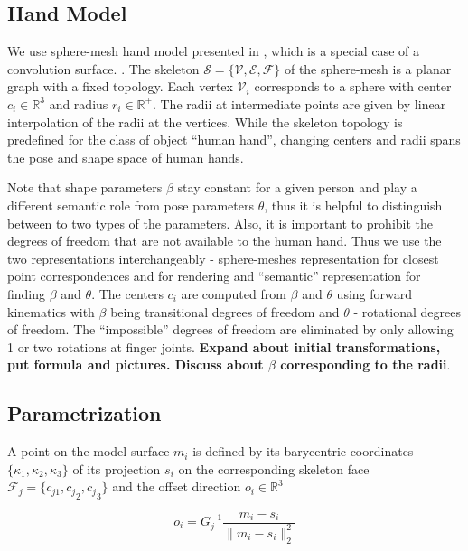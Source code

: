 \documentclass[10pt,twocolumn,letterpaper]{article}
\begin{document}
\subsection {Hand Model}

We use sphere-mesh hand model presented in \cite{tkach2016sphere}, which is a special case of a convolution surface. \textbf{\color{accent}{Maybe briefly recap advantages of sphere-meshes hand model representation}}. 
The skeleton $\mathcal{S} = \{\mathcal{V}, \mathcal{E}, \mathcal{F}\}$ of the sphere-mesh is a planar graph with a fixed topology. Each vertex $\mathcal{V}_i$ corresponds to a sphere with center $c_i \in \mathbb{R}^3$ and radius $r_i \in \mathbb{R}^+$. The radii at intermediate points are given by linear interpolation of the radii at the vertices.
While the skeleton topology is predefined for the class of object ``human hand'', changing centers and radii spans the pose and shape space of human hands.

Note that shape parameters $\beta$ stay constant for a given person and play a different semantic role from pose parameters $\theta$, thus it is helpful to distinguish between to two types of the parameters. Also, it is important to prohibit the degrees of freedom that are not available to the human hand. Thus we use the two representations interchangeably - sphere-meshes representation for closest point correspondences and for rendering and ``semantic'' representation for finding $\beta$ and $\theta$.
The centers $c_i$ are computed from $\beta$ and $\theta$ using forward kinematics with $\beta$ being transitional degrees of freedom and $\theta$ - rotational degrees of freedom. The ``impossible'' degrees of freedom are eliminated by only allowing 1 or two rotations at finger joints.
\textbf{\color{accent}Expand about initial transformations, put formula and pictures. Discuss about $\beta$ corresponding to the radii}.

\subsection {Parametrization}

A point on the model surface $m_i$ is defined by its barycentric coordinates $\{\kappa_1, \kappa_2, \kappa_3\} $ of its projection $s_i$ on the corresponding skeleton face $\mathcal{F}_j = \{c_{j1}, {c_j}_2, {c_j}_3\}$ and the offset direction $o_i \in \mathbb{R}^3$

\begin{equation}
o_i = G_j^{-1} \frac{m_i - s_i} {\| m_i - s_i \|_2^2}
\end{equation}
\end{document}
